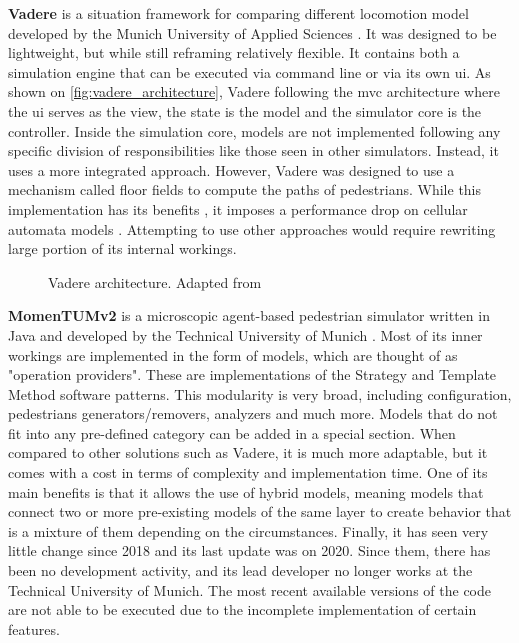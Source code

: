 \documentclass[twoside, 11pt]{article}
\begin{document}
\textbf{Vadere} is a situation framework for comparing different locomotion model developed by the Munich University of Applied Sciences \cite{kleinmeierVadereOpenSourceSimulation2019}. It was designed to be lightweight, but while still reframing relatively flexible. It contains both a simulation engine that can be executed via command line or via its own \gls{ui}. As shown on \autoref{fig:vadere_architecture}, Vadere following the \gls{mvc} architecture where the \gls{ui} serves as the view, the state is the model and the simulator core is the controller. Inside the simulation core, models are not implemented following any specific division of responsibilities like those seen in other simulators. Instead, it uses a more integrated approach. However, Vadere was designed to use a mechanism called floor fields to compute the paths of pedestrians. While this implementation has its benefits \cite{seitzSuperpositionPrincipleConceptual2016}, it imposes a performance drop on cellular automata models \cite{kleinmeierVadereOpenSourceSimulation2019}. Attempting to use other approaches would require rewriting large portion of its internal workings.

\begin{figure}[h]
  \centering
  
  \caption{Vadere architecture. Adapted from \cite{seitzSuperpositionPrincipleConceptual2016}}
  \label{fig:vadere_architecture}
\end{figure}

\textbf{MomenTUMv2} is a microscopic agent-based pedestrian simulator written in Java and developed by the Technical University of Munich \cite{kielarMomenTUMv2ModularExtensible2016}. Most of its inner workings are implemented in the form of models, which are thought of as "operation providers". These are implementations of the Strategy and Template Method software patterns. This modularity is very broad, including configuration, pedestrians generators/removers, analyzers and much more. Models that do not fit into any pre-defined category can be added in a special section. When compared to other solutions such as Vadere, it is much more adaptable, but it comes with a cost in terms of complexity and implementation time. One of its main benefits is that it allows the use of hybrid models, meaning models that connect two or more pre-existing models of the same layer to create behavior that is a mixture of them depending on the circumstances. Finally, it has seen very little change since 2018 and its last update was on 2020. Since them, there has been no development activity, and its lead developer no longer works at the Technical University of Munich. The most recent available versions of the code are not able to be executed due to the incomplete implementation of certain features.
\end{document}
